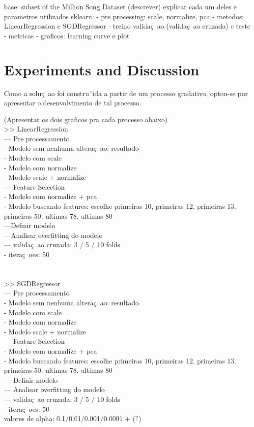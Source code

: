 \documentclass[conference]{IEEEtran}
\begin{document}
base: subset of the Million Song Dataset (descrever)
explicar cada um deles e parametros utilizados
sklearn:
- pre processing: scale, normalize, pca
- metodos: LinearRegression e SGDRegressor
- treino validaç~ao (validaç~ao cruzada) e teste
- metricas
- graficos: learning curve e plot

\section{Experiments and Discussion}

Como a soluç~ao foi constru´ida a partir de um processo gradativo, optou-se por apresentar o desenvolvimento de tal processo.

(Apresentar os dois graficos pra cada processo abaixo)\\

>> LinearRegression\\
--- Pre processamento\\
- Modelo sem nenhuma alteraç~ao: resultado\\
- Modelo com scale\\
- Modelo com normalize\\
- Modelo scale + normalize\\
--- Feature Selection\\
- Modelo com normalize + pca\\
- Modelo buscando features: escolhe primeiras 10, primeiras 12, primeiras 13, primeiras 50, ultimas 78, ultimas 80\\
---Definir modelo\\
---Analisar overfitting do modelo\\
--- validaç~ao cruzada: 3 / 5 / 10 folds\\
- iteraç~oes: 50\\
\\
\\
>> SGDRegressor \\
--- Pre processamento\\
- Modelo sem nenhuma alteraç~ao: resultado\\
- Modelo com scale\\
- Modelo com normalize\\
- Modelo scale + normalize\\
--- Feature Selection\\
- Modelo com normalize + pca\\
- Modelo buscando features: escolhe primeiras 10, primeiras 12, primeiras 13, primeiras 50, ultimas 78, ultimas 80\\
--- Definir modelo\\
--- Analisar overfitting do modelo\\
--- validaç~ao cruzada: 3 / 5 / 10 folds\\
- iteraç~oes: 50\\
valores de alpha: 0.1/0.01/0.001/0.0001 + (?)\\
\end{document}
